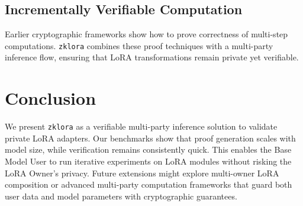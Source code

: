 \documentclass[11pt]{article}
\begin{document}
\subsection{Incrementally Verifiable Computation}
Earlier cryptographic frameworks \cite{valiant2008incrementally, kothapalli2022nova, kothapalli2024hypernova} show how to prove correctness of multi-step computations. \texttt{zklora} combines these proof techniques with a multi-party inference flow, ensuring that LoRA transformations remain private yet verifiable.

\section{Conclusion}

We present \texttt{zklora} as a verifiable multi-party inference solution to validate private LoRA adapters. Our benchmarks show that proof generation scales with model size, while verification remains consistently quick. This enables the Base Model User to run iterative experiments on LoRA modules without risking the LoRA Owner’s privacy. Future extensions might explore multi-owner LoRA composition or advanced multi-party computation frameworks that guard both user data and model parameters with cryptographic guarantees.



\end{document}
